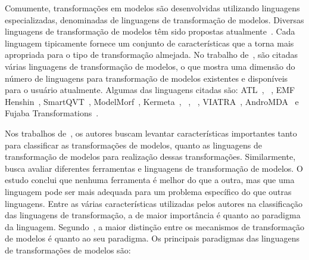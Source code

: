 Comumente, transformações em modelos são desenvolvidas utilizando linguagens especializadas, denominadas de linguagens de transformação de modelos. Diversas linguagens de transformação de modelos têm sido propostas atualmente~\cite{Allilaire_06, Biehl_2010}. Cada linguagem tipicamente fornece um conjunto de características que a torna mais apropriada para o tipo de transformação almejada. No trabalho de~, são citadas várias linguagens de transformação de modelos, o que mostra uma dimensão do número de linguagens para transformação de modelos existentes e disponíveis para o usuário atualmente. Algumas das linguagens citadas são: ATL~\cite{ATL_eclipse,Jouault_2008}, ~\cite{QVT:OMG}, EMF Henshin~\cite{EMF_Henshin}, SmartQVT~\cite{SmartQVT}, ModelMorf~\cite{ModelMorf}, Kermeta~\cite{kermeta}, ~\cite{ETL_eclipse}, ~\cite{OpenArchitectureWare}, VIATRA~\cite{viatra}, AndroMDA~\cite{andromda} e Fujaba Transformations~\cite{fujaba}.

Nos trabalhos de~, os autores buscam levantar características importantes tanto para classificar as transformações de modelos, quanto as linguagens de transformação de modelos  para realização dessas transformações. Similarmente,~ busca avaliar diferentes ferramentas e linguagens de transformação de modelos. O estudo conclui que nenhuma ferramenta é melhor do que a outra, mas que uma linguagem pode ser mais adequada para um problema específico do que outras linguagens. Entre as várias características utilizadas pelos autores na classificação das linguagens de transformação, a de maior importância é quanto ao paradigma da linguagem. Segundo~, a maior distinção entre os mecanismos de transformação de modelos é quanto ao seu paradigma. Os principais paradigmas das linguagens de transformações de modelos são:

